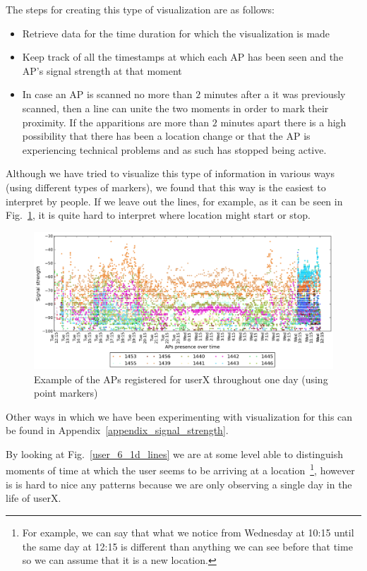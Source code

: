 The steps for creating this type of visualization are as follows:
\begin{itemize}
  \item Retrieve data for the time duration for which the visualization is made
  \item Keep track of all the timestamps at which each AP has been seen and the
  AP's signal strength at that moment
  \item In case an AP is scanned no more than $2$ minutes after a it was
  previously scanned, then a line can unite the two moments in order to mark
  their proximity. If the apparitions are more than $2$ minutes apart there is
  a high possibility that there has been a location change or that the AP is
  experiencing technical problems and as such has stopped being active.
\end{itemize}

Although we have tried to visualize this type of information in various ways
(using different types of markers), we found that this way is the easiest to
interpret by people. If we leave out the lines, for example, as it can be seen
in Fig.~\ref{user_6_1d_point}, it is quite hard to interpret where location
might start or stop.

\begin{figure}[h]
\centering
\includegraphics[height =
0.45\textwidth]{figures/point_user_6_sorted_1days_plot.png}
\caption{Example of the APs registered for userX throughout one day (using
point markers)}
\label{user_6_1d_point}
\end{figure}

Other ways in which we have been experimenting with visualization for this can
be found in Appendix~\ref{appendix_signal_strength}.

By looking at Fig.~\ref{user_6_1d_lines} we are at some level able to
distinguish moments of time at which the user seems to be arriving at a
location~\footnote{For example, we can say that what we notice from Wednesday
at 10:15 until the same day at 12:15 is different than anything we can see
before that time so we can assume that it is a new location.}, however is is
hard to nice any patterns because we are only observing a single day in the life
of userX. 

